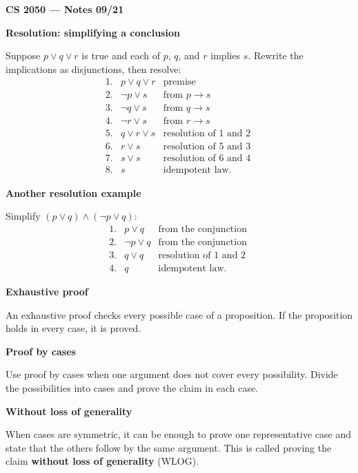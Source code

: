 \documentclass[letterpaper]{article}
\newcommand{\noteheader}[1]{\par\bigskip\noindent\textbf{#1}\par\medskip}
\begin{document}
\textbf{CS 2050 --- Notes 09/21}

\noteheader{Resolution: simplifying a conclusion}

Suppose $p\lor q\lor r$ is true and each of $p$, $q$, and $r$ implies $s$.
Rewrite the implications as disjunctions, then resolve:
\[
\begin{array}{rll}
1.&p\lor q\lor r&\text{premise}\;\\[2pt]
2.&\neg p\lor s&\text{from }p\to s\;\\[2pt]
3.&\neg q\lor s&\text{from }q\to s\;\\[2pt]
4.&\neg r\lor s&\text{from }r\to s\;\\[4pt]
5.&q\lor r\lor s&\text{resolution of 1 and 2}\;\\[2pt]
6.&r\lor s&\text{resolution of 5 and 3}\;\\[2pt]
7.&s\lor s&\text{resolution of 6 and 4}\;\\[2pt]
8.&s&\text{idempotent law.}
\end{array}
\]

\noteheader{Another resolution example}

Simplify $(p\lor q)\land(\neg p\lor q)$:
\[
\begin{array}{rll}
1.&p\lor q&\text{from the conjunction}\;\\[2pt]
2.&\neg p\lor q&\text{from the conjunction}\;\\[2pt]
3.&q\lor q&\text{resolution of 1 and 2}\;\\[2pt]
4.&q&\text{idempotent law.}
\end{array}
\]

\clearpage

\noteheader{Exhaustive proof}

An exhaustive proof checks every possible case of a proposition. If the
proposition holds in every case, it is proved.

\noteheader{Proof by cases}

Use proof by cases when one argument does not cover every possibility.
Divide the possibilities into cases and prove the claim in each case.

\noteheader{Without loss of generality}

When cases are symmetric, it can be enough to prove one representative case
and state that the others follow by the same argument. This is called
proving the claim \textbf{without loss of generality} (WLOG).
\end{document}
